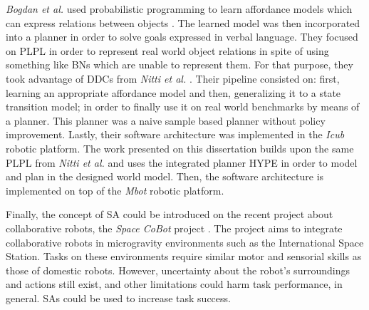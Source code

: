 \textit{Bogdan et al.} used probabilistic programming to learn affordance models which can 
express relations between objects \cite{moldovan2017relational}.
The learned model was then incorporated into a planner in order to solve goals expressed 
in verbal language. They focused on \gls{PLPL} in order to represent real world object 
relations in spite of using something like \glspl{BN} which are unable to represent them. 
For that purpose, they took advantage of \glspl{DDC} from \textit{Nitti et al.} 
\cite{nitti2016probabilistic}. Their pipeline consisted on: first, learning an appropriate
affordance model and then, generalizing it to a state transition model; in order to
finally use it on real world benchmarks by means of a planner. This planner was a naive 
sample based planner without policy improvement. Lastly, their software architecture was 
implemented in the \textit{Icub} robotic platform. The work presented on this dissertation 
builds upon the same \gls{PLPL} from \textit{Nitti et al.} and uses the integrated planner \gls{HYPE}
in order to model and plan in the designed world model. Then, the software architecture is 
implemented on top of the \textit{Mbot} robotic platform.

Finally, the concept of \gls{SA} could be introduced on the recent project about
collaborative robots, the \textit{Space CoBot} project \cite{roque2016space}. The project
aims to integrate collaborative robots in microgravity environments such as the
International Space Station. Tasks on these environments require similar motor and sensorial skills 
as those of domestic robots. However, uncertainty about the robot's surroundings and actions still
exist, and other limitations could harm task performance, in general. \glspl{SA} could be used to
increase task success.
